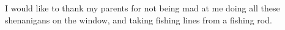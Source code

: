 I would like to thank my parents for not being mad at me doing all these shenanigans on the window, and taking fishing lines from a fishing rod.